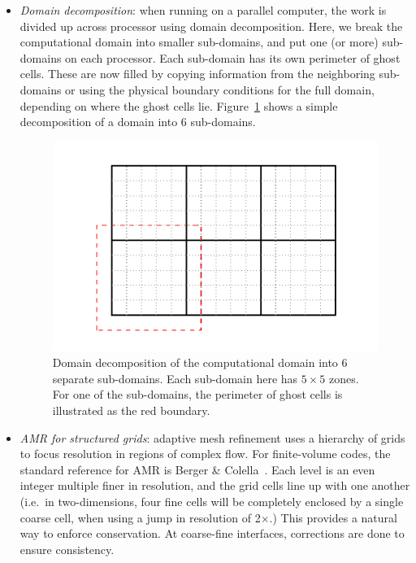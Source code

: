 \begin{itemize}

\item {\em Domain decomposition}: when running on a parallel computer,
 the work is divided up across processor using domain decomposition.
 Here, we break the computational domain into smaller sub-domains, and
 put one (or more) sub-domains on each processor.  Each sub-domain
 has its own perimeter of ghost cells.  These are now filled by copying
 information from the neighboring sub-domains or using the physical
 boundary conditions for the full domain, depending on where the
 ghost cells lie.  Figure~\ref{fig:domain} shows a simple decomposition of
 a domain into 6 sub-domains.

 \begin{figure}
 \centering
 \includegraphics[width=\linewidth]{domain}
 \caption[Domain decomposition example] {\label{fig:domain} Domain
   decomposition of the computational domain into 6 separate
   sub-domains.  Each sub-domain here has $5\times 5$ zones.  For one
   of the sub-domains, the perimeter of ghost cells is illustrated as
   the red boundary.}
 \end{figure}

\item {\em AMR for structured grids}: adaptive mesh refinement uses a
  hierarchy of grids to focus resolution in regions of complex flow.
  For finite-volume codes, the standard reference for AMR is Berger \&
  Colella~\cite{berger-colella}.  Each level is an even integer
  multiple finer in resolution, and the grid cells line up with one
  another (i.e.\ in two-dimensions, four fine cells will be completely
  enclosed by a single coarse cell, when using a jump in resolution of
  2$\times$.)  This provides a natural way to enforce conservation.
  At coarse-fine interfaces, corrections are done to ensure
  consistency.


\end{itemize}
